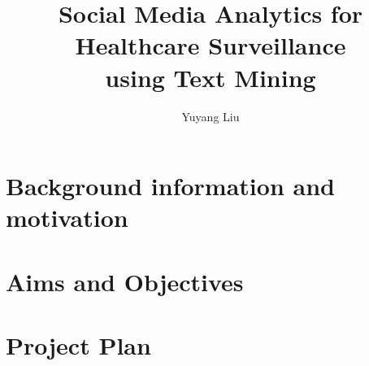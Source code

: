 \documentclass[12pt]{report}
\begin{document}
\title{Social Media Analytics for Healthcare Surveillance \\using Text Mining}
\author{Yuyang Liu}
\maketitle

\chapter{Background information and motivation}

 
\chapter{Aims and Objectives}

 
\chapter{Project Plan}

 






\end{document}
